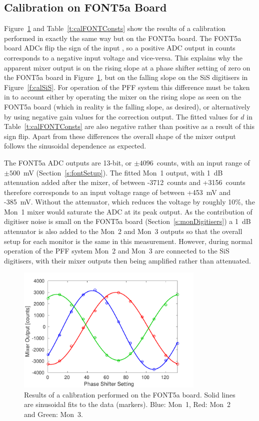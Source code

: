 \subsection{Calibration on FONT5a Board}
\label{ss:FONTCal}

Figure~\ref{f:calFONT} and Table~\ref{t:calFONTConsts} show the results of a calibration performed in exactly the same way but on the FONT5a board. The FONT5a board ADCs flip the sign of the input \cite{glennPriv}, so a positive ADC output in counts corresponds to a negative input voltage and vice-versa. This explains why the apparent mixer output is on the rising slope at a phase shifter setting of zero on the FONT5a board in Figure~\ref{f:calFONT}, but on the falling slope on the SiS digitisers in Figure~\ref{f:calSiS}. For operation of the PFF system this difference must be taken in to account either by operating the mixer on the rising slope as seen on the FONT5a board (which in reality is the falling slope, as desired), or alternatively by using negative gain values for the correction output. The fitted values for \(d\) in Table~\ref{t:calFONTConsts} are also negative rather than positive as a result of this sign flip. Apart from these differences the overall shape of the mixer output follows the sinusoidal dependence as expected.

The FONT5a ADC outputs are 13-bit, or \(\pm4096\)~counts, with an input range of \(\pm500\)~mV (Section~\ref{s:fontSetup}). The fitted Mon~1 output, with 1~dB attenuation added after the mixer, of between -3712~counts and +3156~counts therefore corresponds to an input voltage range of between +453~mV and -385~mV. Without the attenuator, which reduces the voltage by roughly 10\%, the Mon~1 mixer would saturate the ADC at its peak output. As the contribution of digitiser noise is small on the FONT5a board (Section~\ref{s:monDigitisers}) a 1~dB attenuator is also added to the Mon~2 and Mon~3 outputs so that the overall setup for each monitor is the same in this measurement. However, during normal operation of the PFF system Mon~2 and Mon~3 are connected to the SiS digitisers, with their mixer outputs then being amplified rather than attenuated.

\begin{figure}
  \centering
  \includegraphics[width=0.8\textwidth]{Figures/phaseMons/calFONT}
  \caption{Results of a calibration performed on the FONT5a board. Solid lines are sinusoidal fits to the data (markers). Blue: Mon~1, Red: Mon~2 and Green: Mon~3.}
  \label{f:calFONT}
\end{figure}


